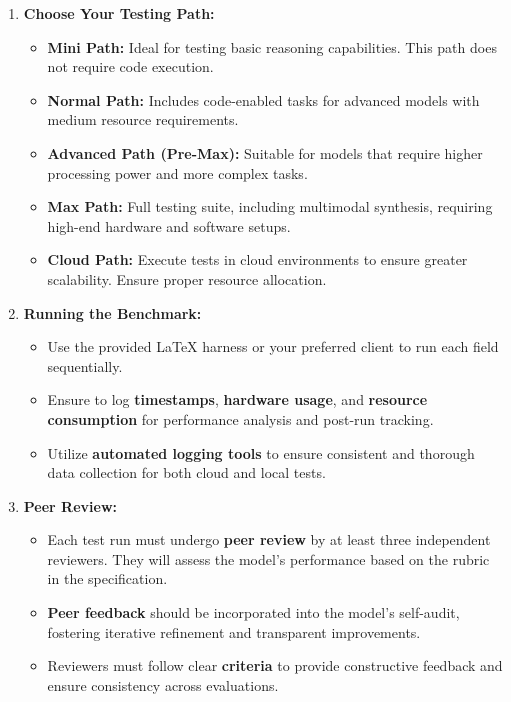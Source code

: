 \begin{enumerate}
  \item \textbf{Choose Your Testing Path:}
  \begin{itemize}
    \item \textbf{Mini Path:} Ideal for testing basic reasoning capabilities. This path does not require code execution.
    \item \textbf{Normal Path:} Includes code-enabled tasks for advanced models with medium resource requirements.
    \item \textbf{Advanced Path (Pre-Max):} Suitable for models that require higher processing power and more complex tasks.
    \item \textbf{Max Path:} Full testing suite, including multimodal synthesis, requiring high-end hardware and software setups.
    \item \textbf{Cloud Path:} Execute tests in cloud environments to ensure greater scalability. Ensure proper resource allocation.
  \end{itemize}

  \item \textbf{Running the Benchmark:}
  \begin{itemize}
    \item Use the provided LaTeX harness or your preferred client to run each field sequentially.
    \item Ensure to log \textbf{timestamps}, \textbf{hardware usage}, and \textbf{resource consumption} for performance analysis and post-run tracking.
    \item Utilize \textbf{automated logging tools} to ensure consistent and thorough data collection for both cloud and local tests.
  \end{itemize}

  \item \textbf{Peer Review:}
  \begin{itemize}
    \item Each test run must undergo \textbf{peer review} by at least three independent reviewers. They will assess the model's performance based on the rubric in the specification.
    \item \textbf{Peer feedback} should be incorporated into the model's self-audit, fostering iterative refinement and transparent improvements.
    \item Reviewers must follow clear \textbf{criteria} to provide constructive feedback and ensure consistency across evaluations.
  \end{itemize}
\end{enumerate}

